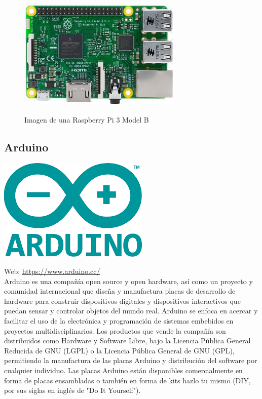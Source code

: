 \begin{figure}[H]
  \begin{center}
    \includegraphics[scale=0.6]{imagenes/raspberry-pi.jpg}\\
    \caption{Imagen de una Raspberry Pi 3 Model B}
  \end{center}
\end{figure}


\subsection{ Arduino }

\begin{center}
\includegraphics[scale=0.6]{imagenes/arduino_logo.png}
\end{center}

Web: \url{https://www.arduino.cc/}\\

Arduino es una compañía open source y open hardware, así como un proyecto y comunidad internacional que diseña y manufactura placas de desarrollo de hardware para construir
dispositivos digitales y dispositivos interactivos que puedan sensar y controlar objetos del mundo real. Arduino se enfoca en acercar y facilitar el uso de la electrónica y 
programación de sistemas embebidos en proyectos multidisciplinarios. Los productos que vende la compañía son distribuidos como Hardware y Software Libre, bajo la Licencia Pública 
General Reducida de GNU (LGPL) o la Licencia Pública General de GNU (GPL), ​permitiendo la manufactura de las placas Arduino y distribución del software por cualquier individuo.
Las placas Arduino están disponibles comercialmente en forma de placas ensambladas o también en forma de kits hazlo tu mismo (DIY, por sus siglas en inglés de "Do It Yourself").\\

